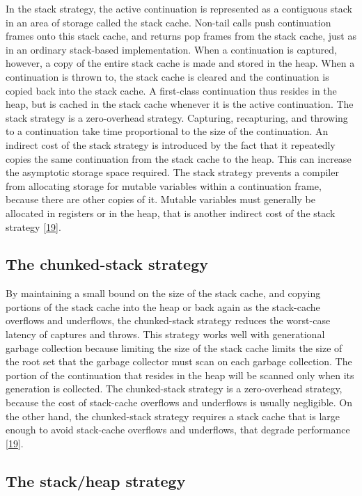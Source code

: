 \documentclass[12pt,a4paper,oneside,openright]{book}
\begin{document}
In the stack strategy, the active continuation is represented as a
contiguous stack in an area of storage called the stack cache. Non-tail
calls push continuation frames onto this stack cache, and returns pop
frames from the stack cache, just as in an ordinary stack-based
implementation. When a continuation is captured, however, a copy of the
entire stack cache is made and stored in the heap. When a continuation
is thrown to, the stack cache is cleared and the continuation is copied
back into the stack cache. A first-class continuation thus resides in
the heap, but is cached in the stack cache whenever it is the active
continuation. The stack strategy is a zero-overhead strategy. Capturing,
recapturing, and throwing to a continuation take time proportional to
the size of the continuation. An indirect cost of the stack strategy is
introduced by the fact that it repeatedly copies the same continuation
from the stack cache to the heap. This can increase the asymptotic
storage space required. The stack strategy prevents a compiler from
allocating storage for mutable variables within a continuation frame,
because there are other copies of it. Mutable variables must generally
be allocated in registers or in the heap, that is another indirect cost
of the stack strategy {[}\hyperref[ref-Clinger1999]{19}{]}.

\subsection{The chunked-stack
strategy}\label{the-chunked-stack-strategy}

By maintaining a small bound on the size of the stack cache, and copying
portions of the stack cache into the heap or back again as the
stack-cache overflows and underflows, the chunked-stack strategy reduces
the worst-case latency of captures and throws. This strategy works well
with generational garbage collection because limiting the size of the
stack cache limits the size of the root set that the garbage collector
must scan on each garbage collection. The portion of the continuation
that resides in the heap will be scanned only when its generation is
collected. The chunked-stack strategy is a zero-overhead strategy,
because the cost of stack-cache overflows and underflows is usually
negligible. On the other hand, the chunked-stack strategy requires a
stack cache that is large enough to avoid stack-cache overflows and
underflows, that degrade performance
{[}\hyperref[ref-Clinger1999]{19}{]}.

\subsection{The stack/heap strategy}\label{the-stackheap-strategy}
\end{document}
